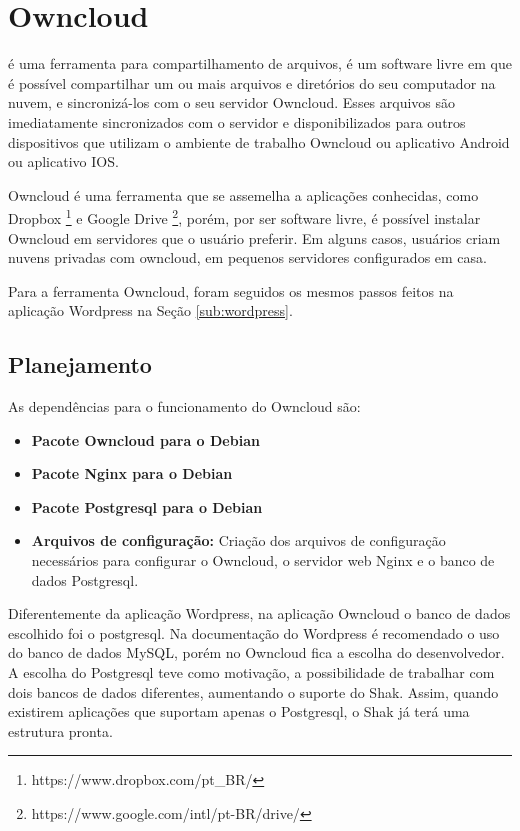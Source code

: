\section{Owncloud}
\label{sub:owncloud}

 é uma ferramenta para compartilhamento de arquivos, é um software 
livre em que é possível compartilhar
um ou mais arquivos e diretórios do seu computador na nuvem, e sincronizá-los com o seu
servidor Owncloud. Esses arquivos são imediatamente sincronizados com o servidor
e disponibilizados para outros dispositivos que utilizam o ambiente de trabalho
Owncloud ou aplicativo Android ou aplicativo IOS.

Owncloud é uma ferramenta que se assemelha a aplicações conhecidas, como Dropbox
\footnote{https://www.dropbox.com/pt\_BR/} e Google Drive \footnote{https://www.google.com/intl/pt-BR/drive/}, porém, por ser software livre, é possível instalar Owncloud em servidores
que o usuário preferir. Em alguns casos, usuários criam nuvens privadas com 
owncloud, em pequenos servidores configurados em casa.

Para a ferramenta Owncloud, foram seguidos os mesmos passos feitos na aplicação
Wordpress na Seção \ref{sub:wordpress}.

\subsection{Planejamento}

As dependências para o funcionamento do Owncloud são:

\begin{itemize}
   \item \textbf{Pacote Owncloud para o Debian}
   \item \textbf{Pacote Nginx para o Debian}
   \item \textbf{Pacote Postgresql para o Debian}
   \item \textbf{Arquivos de configuração:} Criação dos arquivos de configuração
   necessários para configurar o Owncloud, o servidor web Nginx e o banco de dados
   Postgresql.
\end{itemize}

Diferentemente da aplicação Wordpress, na aplicação Owncloud o 
banco de dados escolhido foi o postgresql. Na documentação do Wordpress é recomendado
o uso do banco de dados MySQL, porém no Owncloud fica a escolha do desenvolvedor.
A escolha do Postgresql teve como motivação, a possibilidade de trabalhar com dois bancos de
dados diferentes, aumentando o suporte do Shak. Assim, quando existirem aplicações
que suportam apenas o Postgresql, o Shak já terá uma estrutura pronta.

